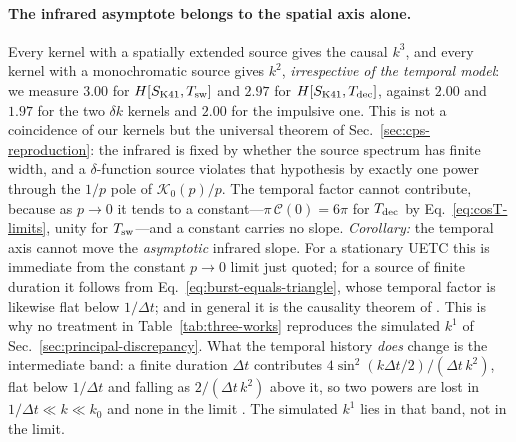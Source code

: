 \documentclass[10pt,prd,aps,nobibnotes,superscriptaddress,preprintnumbers,notitlepage]{revtex4-1}
\newcommand{\add}[1]{{\color{red}#1}}
\newcommand{\add}[1]{#1}
\begin{document}
\paragraph{The infrared \add{asymptote} belongs to the spatial axis alone.}
Every kernel with a spatially extended source gives the causal $k^{3}$, and
every kernel with a monochromatic source gives $k^{2}$, \emph{irrespective of
the temporal model}: we measure $3.00$ for $H[S_{\rm K41},T_{\rm sw}]$ and
$2.97$ for $H[S_{\rm K41},T_{\rm dec}]$, against $2.00$ and $1.97$ for the two
$\delta k$ kernels and $2.00$ for the impulsive one. This is not a coincidence
of our kernels but the universal theorem of Sec.~\ref{sec:cps-reproduction}: the
infrared is fixed by whether the source spectrum has finite width, and a
$\delta$-function source violates that hypothesis by exactly one power through
the $1/p$ pole of $\mathcal{K}_{0}(p)/p$. The temporal factor cannot contribute,
because as $p\to0$ it tends to a constant---$\pi\,\mathcal{C}(0)=6\pi$ for
$T_{\rm dec}$ by Eq.~\eqref{eq:cosT-limits}, unity for $T_{\rm sw}$---and a
constant carries no slope. \emph{Corollary:} \add{the temporal axis cannot move the
\emph{asymptotic} infrared slope. For a stationary UETC this is immediate from the
constant $p\to0$ limit just quoted; for a source of finite duration it follows from
Eq.~\eqref{eq:burst-equals-triangle}, whose temporal factor is likewise flat below
$1/\Delta t$; and in general it is the causality theorem of \cite{Cai:2019cdl}. This is
why \add{no treatment in Table~\ref{tab:three-works} reproduces} the simulated
$k^{1}$ of Sec.~\ref{sec:principal-discrepancy}. What the temporal history \emph{does} change
is the intermediate band: a finite duration $\Delta t$ contributes
$4\sin^{2}(k\Delta t/2)/(\Delta t\,k^{2})$, flat below $1/\Delta t$ and falling as
$2/(\Delta t\,k^{2})$ above it, so two powers are lost in $1/\Delta t\ll k\ll k_{0}$ and
none in the limit \cite{Caprini:2009fx,RoperPol:2022iel,RoperPol:2023dzg}. The simulated
$k^{1}$ lies in that band, not in the limit.}
\end{document}
